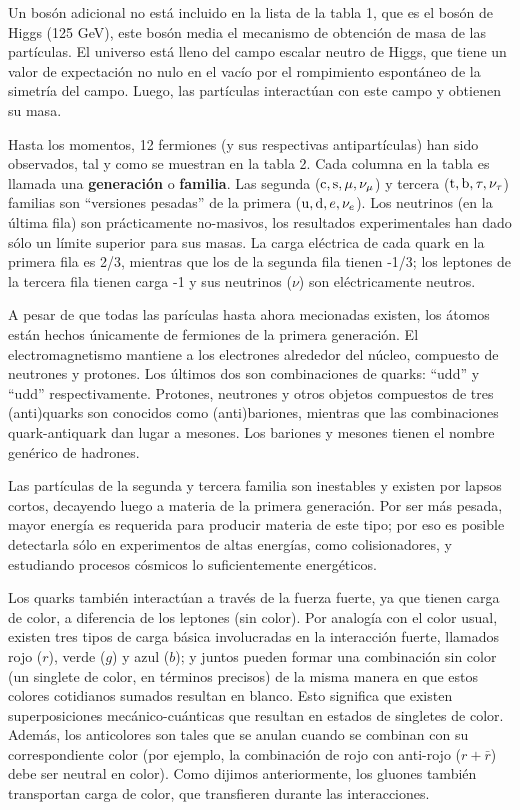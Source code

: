 \documentclass[a4paper,12pt]{article}
\begin{document}
Un bosón adicional no está incluido en la lista de la tabla 1, que es el bosón de Higgs (125 GeV), este bosón media el mecanismo de obtención de masa de las partículas. El universo está lleno del campo escalar neutro de Higgs, que tiene un valor de expectación no nulo en el vacío por el rompimiento espontáneo de la simetría del campo. Luego, las partículas interactúan con este campo y obtienen su masa. 

Hasta los momentos, 12 fermiones (y sus respectivas antipartículas) han sido observados, tal y como se muestran en la tabla 2. Cada columna en la tabla es llamada una \textbf{generación} o \textbf{familia}. Las segunda (${\mathrm c},{\mathrm s},\mu,\nu_\mu$) y tercera (${\mathrm t},{\mathrm b},\tau,\nu_\tau$) familias son ``versiones pesadas'' de la primera (${\mathrm u},{\mathrm d},e,\nu_e$). Los neutrinos (en la última fila) son prácticamente no-masivos, los resultados experimentales han dado sólo un límite superior para sus masas. La carga eléctrica de cada quark en la primera fila es 2/3, mientras que los de la segunda fila tienen -1/3; los leptones de la tercera fila tienen carga -1 y sus neutrinos ($\nu$) son eléctricamente neutros.

A pesar de que todas las parículas hasta ahora mecionadas existen, los átomos están hechos únicamente de fermiones de la primera generación. El electromagnetismo mantiene a los electrones alrededor del núcleo, compuesto de neutrones y protones. Los últimos dos son combinaciones de quarks: ``udd'' y ``udd'' respectivamente. Protones, neutrones y otros objetos compuestos de tres (anti)quarks son conocidos como (anti)bariones, mientras que las combinaciones quark-antiquark dan lugar a mesones. Los bariones y mesones tienen el nombre genérico de hadrones.

Las partículas de la segunda y tercera familia son inestables y existen por lapsos cortos, decayendo luego a materia de la primera generación. Por ser más pesada, mayor energía es requerida para producir materia de este tipo; por eso es posible detectarla sólo en experimentos de altas energías, como colisionadores, y estudiando procesos cósmicos lo suficientemente energéticos.

Los quarks también interactúan a través de la fuerza fuerte, ya que tienen carga de color, a diferencia de los leptones (sin color). Por analogía con el color usual, existen tres tipos de carga básica involucradas en la interacción fuerte, llamados rojo ($r$), verde ($g$) y azul ($b$); y juntos pueden formar una combinación sin color (un singlete de color, en términos precisos) de la misma manera en que estos colores cotidianos sumados resultan en blanco. Esto significa que existen superposiciones mecánico-cuánticas que resultan en estados de singletes de color. Además, los anticolores son tales que se anulan cuando se combinan con su correspondiente color (por ejemplo, la combinación de rojo con anti-rojo ($r+\bar{r}$) debe ser neutral en color). Como dijimos anteriormente, los gluones también transportan carga de color, que transfieren durante las interacciones.
\end{document}
